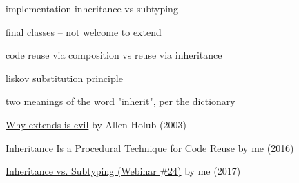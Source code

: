 \documentclass{article}
\begin{document}
implementation inheritance vs subtyping

final classes -- not welcome to extend

code reuse via composition vs reuse via inheritance

liskov substitution principle

two meanings of the word "inherit", per the dictionary



\href{https://www.infoworld.com/article/2073649/why-extends-is-evil.html}{Why extends is evil} by Allen Holub (2003)

\href{https://www.yegor256.com/2016/09/13/inheritance-is-procedural.html}{Inheritance Is a Procedural Technique for Code Reuse} by me (2016)

\href{https://www.youtube.com/watch?v=DjrA7_Uymok}{Inheritance vs. Subtyping (Webinar \#24)} by me (2017)
\end{document}
